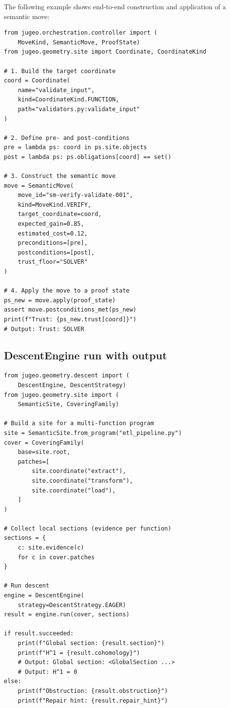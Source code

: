 \documentclass[11pt]{article}
\begin{document}
The following example shows end-to-end construction and
application of a semantic move:

\begin{lstlisting}[caption={Constructing and applying a SemanticMove.},
                   label=lst:sm-example]
from jugeo.orchestration.controller import (
    MoveKind, SemanticMove, ProofState)
from jugeo.geometry.site import Coordinate, CoordinateKind

# 1. Build the target coordinate
coord = Coordinate(
    name="validate_input",
    kind=CoordinateKind.FUNCTION,
    path="validators.py:validate_input"
)

# 2. Define pre- and post-conditions
pre = lambda ps: coord in ps.site.objects
post = lambda ps: ps.obligations[coord] == set()

# 3. Construct the semantic move
move = SemanticMove(
    move_id="sm-verify-validate-001",
    kind=MoveKind.VERIFY,
    target_coordinate=coord,
    expected_gain=0.85,
    estimated_cost=0.12,
    preconditions=[pre],
    postconditions=[post],
    trust_floor="SOLVER"
)

# 4. Apply the move to a proof state
ps_new = move.apply(proof_state)
assert move.postconditions_met(ps_new)
print(f"Trust: {ps_new.trust[coord]}")
# Output: Trust: SOLVER
\end{lstlisting}

\subsection{DescentEngine run with output}\label{sec:api-descent-example}

\begin{lstlisting}[caption={DescentEngine end-to-end run.},
                   label=lst:descent-example]
from jugeo.geometry.descent import (
    DescentEngine, DescentStrategy)
from jugeo.geometry.site import (
    SemanticSite, CoveringFamily)

# Build a site for a multi-function program
site = SemanticSite.from_program("etl_pipeline.py")
cover = CoveringFamily(
    base=site.root,
    patches=[
        site.coordinate("extract"),
        site.coordinate("transform"),
        site.coordinate("load"),
    ]
)

# Collect local sections (evidence per function)
sections = {
    c: site.evidence(c)
    for c in cover.patches
}

# Run descent
engine = DescentEngine(
    strategy=DescentStrategy.EAGER)
result = engine.run(cover, sections)

if result.succeeded:
    print(f"Global section: {result.section}")
    print(f"H^1 = {result.cohomology}")
    # Output: Global section: <GlobalSection ...>
    # Output: H^1 = 0
else:
    print(f"Obstruction: {result.obstruction}")
    print(f"Repair hint: {result.repair_hint}")
\end{lstlisting}
\end{document}

